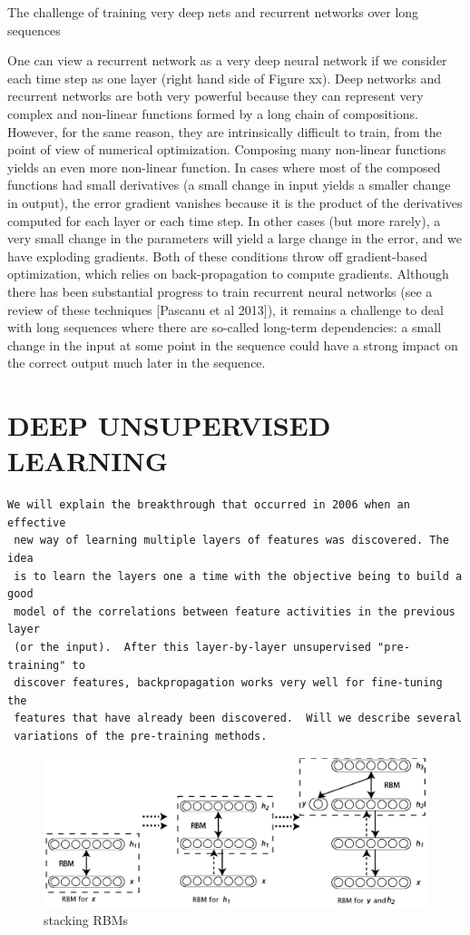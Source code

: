 \documentclass{article} %
\begin{document}
The challenge of training very deep nets and recurrent networks over long sequences


One can view a recurrent network as a very deep neural network if we
consider each time step as one layer (right hand side of Figure xx). Deep
networks and recurrent networks are both very powerful because they can
represent very complex and non-linear functions formed by a long chain of
compositions. However, for the same reason, they are intrinsically
difficult to train, from the point of view of numerical
optimization. Composing many non-linear functions yields an even more
non-linear function. In cases where most of the composed functions had
small derivatives (a small change in input yields a smaller change in
output), the error gradient vanishes because it is the product of the
derivatives computed for each layer or each time step. In other cases (but
more rarely), a very small change in the parameters will yield a large
change in the error, and we have exploding gradients. Both of these
conditions throw off gradient-based optimization, which relies on
back-propagation to compute gradients. Although there has been substantial
progress to train recurrent neural networks (see a review of these
techniques [Pascanu et al 2013]), it remains a challenge to deal with long
sequences where there are so-called long-term dependencies: a small change
in the input at some point in the sequence could have a strong impact on
the correct output much later in the sequence.


\section{DEEP UNSUPERVISED LEARNING}


\begin{verbatim}
We will explain the breakthrough that occurred in 2006 when an effective
 new way of learning multiple layers of features was discovered. The idea
 is to learn the layers one a time with the objective being to build a good
 model of the correlations between feature activities in the previous layer
 (or the input).  After this layer-by-layer unsupervised "pre-training" to
 discover features, backpropagation works very well for fine-tuning the
 features that have already been discovered.  Will we describe several
 variations of the pre-training methods.
\end{verbatim}


\begin{figure}[H]
\includegraphics{stacked-rbms.png}
\caption{stacking RBMs}
\end{figure}
\end{document}
